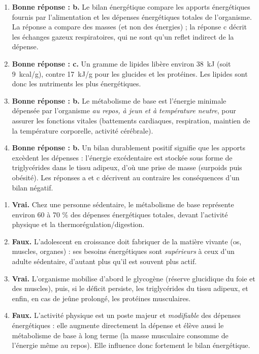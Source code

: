 \documentclass[11pt]{article}
\newcommand{\cle}[1]{{\popxbold\color{popdark}#1}}
\begin{document}
\begin{corrige}
\tcblower
\begin{enumerate}
\item \textbf{Bonne réponse : b.} Le bilan énergétique compare les \cle{apports énergétiques} fournis par l'alimentation et les \cle{dépenses énergétiques} totales de l'organisme. La réponse a compare des masses (et non des énergies) ; la réponse c décrit les échanges gazeux respiratoires, qui ne sont qu'un reflet indirect de la dépense.
\item \textbf{Bonne réponse : c.} Un gramme de lipides libère environ \SI{38}{kJ} (soit \SI{9}{kcal/g}), contre \SI{17}{kJ/g} pour les glucides et les protéines. Les lipides sont donc les nutriments les plus énergétiques.
\item \textbf{Bonne réponse : b.} Le \cle{métabolisme de base} est l'énergie minimale dépensée par l'organisme \emph{au repos, à jeun et à température neutre}, pour assurer les fonctions vitales (battements cardiaques, respiration, maintien de la température corporelle, activité cérébrale).
\item \textbf{Bonne réponse : b.} Un bilan durablement positif signifie que les apports excèdent les dépenses : l'énergie excédentaire est stockée sous forme de \cle{triglycérides} dans le tissu adipeux, d'où une prise de masse (surpoids puis obésité). Les réponses a et c décrivent au contraire les conséquences d'un bilan négatif.
\end{enumerate}
\end{corrige}

\begin{corrige}
\tcblower
\begin{enumerate}
\item \textbf{Vrai.} Chez une personne sédentaire, le métabolisme de base représente environ 60 à 70 \% des dépenses énergétiques totales, devant l'activité physique et la thermorégulation/digestion.
\item \textbf{Faux.} L'adolescent en croissance doit fabriquer de la matière vivante (os, muscles, organes) : ses besoins énergétiques sont \emph{supérieurs} à ceux d'un adulte sédentaire, d'autant plus qu'il est souvent plus actif.
\item \textbf{Vrai.} L'organisme mobilise d'abord le \cle{glycogène} (réserve glucidique du foie et des muscles), puis, si le déficit persiste, les \cle{triglycérides} du tissu adipeux, et enfin, en cas de jeûne prolongé, les protéines musculaires.
\item \textbf{Faux.} L'activité physique est un poste majeur et \emph{modifiable} des dépenses énergétiques : elle augmente directement la dépense et élève aussi le métabolisme de base à long terme (la masse musculaire consomme de l'énergie même au repos). Elle influence donc fortement le bilan énergétique.
\end{enumerate}
\end{corrige}
\end{document}
